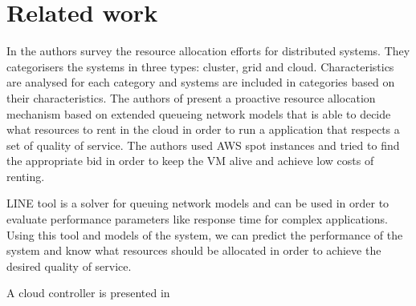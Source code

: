 \section{Related work}
\label{sec:relatesWork}

In \cite{Hussain2013} the authors survey the resource allocation efforts for distributed systems. They categorisers the systems in three types: cluster, grid and cloud. Characteristics are analysed for each category and systems are included in categories based on their characteristics. The authors of \cite{Dubois} present a proactive resource allocation mechanism based on extended queueing network models that is able to decide what resources to rent in the cloud in order to run a application that respects a set of quality of service. The authors used AWS spot instances and tried to find the appropriate bid in order to keep the VM alive and achieve low costs of renting.

LINE \cite{Perez2013} tool is a solver for queuing network models and can be used in order to evaluate performance parameters like response time for complex applications. Using this tool and models of the system, we can predict the performance of the system and know what resources should be allocated in order to achieve the desired quality of service.

A cloud controller is presented in \cite{Jamshidi2015}
